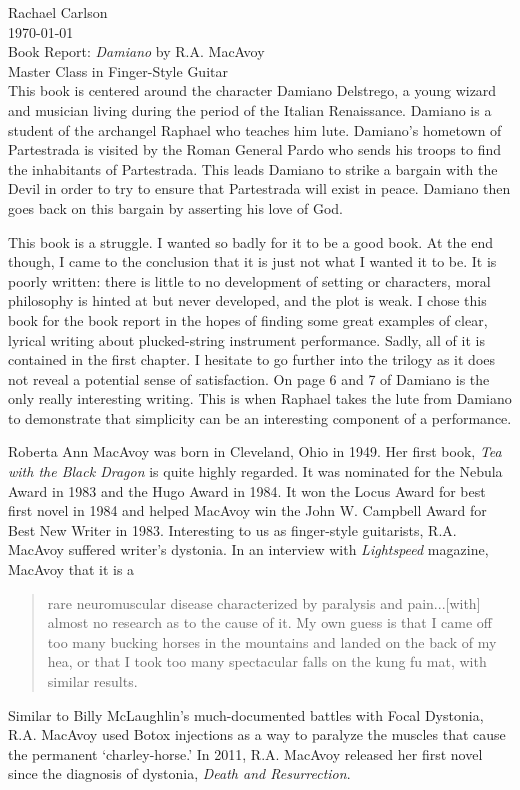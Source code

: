 \documentclass[12pt]{article}
\begin{document}
\noindent Rachael Carlson\\
\noindent \today\\
\noindent Book Report: \emph{Damiano} by R.A. MacAvoy\autocite{damiano}\\
\noindent Master Class in Finger-Style Guitar\\

This book is centered around the character Damiano Delstrego, a young
wizard and musician living during the period of the Italian
Renaissance. Damiano is a student of the archangel Raphael who teaches
him lute. Damiano’s hometown of Partestrada is visited by the Roman
General Pardo who sends his troops to find the inhabitants of
Partestrada. This leads Damiano to strike a bargain with the Devil in
order to try to ensure that Partestrada will exist in peace. Damiano
then goes back on this bargain by asserting his love of God.

This book is a struggle. I wanted so badly for it to be a good
book. At the end though, I came to the conclusion that it is just not
what I wanted it to be. It is poorly written: there is little to no
development of setting or characters, moral philosophy is hinted at
but never developed, and the plot is weak. I chose this book for the
book report in the hopes of finding some great examples of clear,
lyrical writing about plucked-string instrument performance. Sadly,
all of it is contained in the first chapter. I hesitate to go further
into the trilogy as it does not reveal a potential sense of
satisfaction. On page 6 and 7 of Damiano is the only really
interesting writing. This is when Raphael takes the lute from Damiano
to demonstrate that simplicity can be an interesting component of a
performance.

Roberta Ann MacAvoy was born in Cleveland, Ohio in 1949. Her first
book, \emph{Tea with the Black Dragon} is quite highly regarded. It
was nominated for the Nebula Award in 1983\autocite{nebula} and the
Hugo Award in 1984.\autocite{hugo} It won the Locus Award for best
first novel in 1984\autocite{locus} and helped MacAvoy win the John
W. Campbell Award for Best New Writer in 1983. Interesting to us as
finger-style guitarists, R.A. MacAvoy suffered writer's dystonia. In
an interview with \emph{Lightspeed} magazine, MacAvoy that it is a
\begin{quote}
  rare neuromuscular disease characterized by paralysis and
  pain...[with] almost no research as to the cause of it. My own guess
  is that I came off too many bucking horses in the mountains and
  landed on the back of my hea, or that I took too many spectacular
  falls on the kung fu mat, with similar results.\autocite{lightspeed}
\end{quote}
Similar to Billy McLaughlin's much-documented battles with Focal
Dystonia, R.A. MacAvoy used Botox injections as a way to paralyze the
muscles that cause the permanent `charley-horse.' In 2011,
R.A. MacAvoy released her first novel since the diagnosis of dystonia,
\emph{Death and Resurrection}.

\printbibliography
\end{document}
